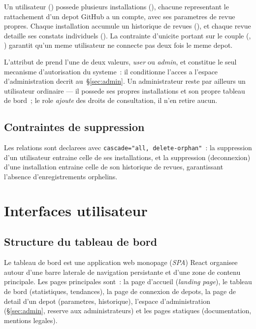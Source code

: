 \documentclass[a4paper,12pt,oneside]{report}
\begin{document}
Un utilisateur () possede plusieurs installations (), chacune representant le rattachement d'un depot GitHub a un compte, avec ses parametres de revue propres. Chaque installation accumule un historique de revues (), et chaque revue detaille ses constats individuels (). La contrainte d'unicite portant sur le couple (, ) garantit qu'un meme utilisateur ne connecte pas deux fois le meme depot.

L'attribut  de  prend l'une de deux valeurs, \emph{user} ou \emph{admin}, et constitue le seul mecanisme d'autorisation du systeme~: il conditionne l'acces a l'espace d'administration decrit au~\S\ref{sec:admin}. Un administrateur reste par ailleurs un utilisateur ordinaire --- il possede ses propres installations et son propre tableau de bord~; le role \emph{ajoute} des droits de consultation, il n'en retire aucun.

\subsection{Contraintes de suppression}

Les relations sont declarees avec \texttt{cascade="all, delete-orphan"}~: la suppression d'un utilisateur entraine celle de ses installations, et la suppression (deconnexion) d'une installation entraine celle de son historique de revues, garantissant l'absence d'enregistrements orphelins.

\section{Interfaces utilisateur}

\subsection{Structure du tableau de bord}

Le tableau de bord est une application web monopage (\emph{SPA}) React organisee autour d'une barre laterale de navigation persistante et d'une zone de contenu principale. Les pages principales sont~: la page d'accueil (\emph{landing page}), le tableau de bord (statistiques, tendances), la page de connexion de depots, la page de detail d'un depot (parametres, historique), l'espace d'administration (\S\ref{sec:admin}, reserve aux administrateurs) et les pages statiques (documentation, mentions legales).
\end{document}
